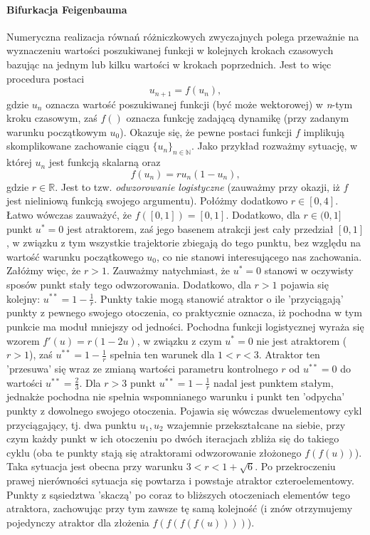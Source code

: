 \documentclass[12pt]{article}
\begin{document}
\paragraph{Bifurkacja Feigenbauma}
Numeryczna realizacja równań różniczkowych zwyczajnych polega przeważnie na wyznaczeniu wartości poszukiwanej funkcji w kolejnych krokach czasowych bazując na jednym lub kilku wartości w krokach poprzednich. Jest to więc procedura postaci
\begin{equation}
\label{discrete_dyn_eq}
u_{n+1} = f(u_{n}),
\end{equation}
gdzie $ u_{n} $ oznacza wartość poszukiwanej funkcji (być może wektorowej) w \textit{n}-tym kroku czasowym, zaś $ f() $ oznacza funkcję zadającą dynamikę (przy zadanym warunku początkowym $ u_{0} $). Okazuje się, że pewne postaci funkcji $ f $ implikują skomplikowane zachowanie ciągu $ \{u_{n}\}_{n\in \mathbb{N}} $. Jako przykład rozważmy sytuację, w której $ u_{n} $ jest funkcją skalarną oraz 
\begin{equation} 
f(u_{n}) = ru_{n}(1-u_{n}),
\end{equation}
gdzie $ r \in \mathbb{R} $. Jest to tzw. \textit{odwzorowanie logistyczne} (zauważmy przy okazji, iż $ f $ jest nieliniową funkcją swojego argumentu). Połóżmy dodatkowo $ r \in [0,4] $. Łatwo wówczas zauważyć, że $ f([0,1]) = [0,1] $. Dodatkowo, dla $ r\in (0,1] $ punkt $ u^{*} = 0 $ jest atraktorem, zaś jego basenem atrakcji jest cały przedział $ [0,1] $, w związku z tym wszystkie trajektorie zbiegają do tego punktu, bez względu na wartość warunku początkowego $ u_{0} $, co nie stanowi interesującego nas zachowania. Załóżmy więc, że $ r>1 $. Zauważmy natychmiast, że $ u^{*} = 0 $ stanowi w oczywisty sposów punkt stały tego odwzorowania. Dodatkowo, dla $ r>1 $ pojawia się kolejny: $ u^{**} = 1-\frac{1}{r} $. Punkty takie mogą stanowić atraktor o ile 'przyciągają' punkty z pewnego swojego otoczenia, co praktycznie oznacza, iż pochodna w tym punkcie ma moduł mniejszy od jedności. Pochodna funkcji logistycznej wyraża się wzorem $ f'(u) = r(1-2u) $, w związku z czym $ u^{*} = 0 $ nie jest atraktorem ($ r>1 $), zaś $ u^{**} = 1-\frac{1}{r} $ spełnia ten warunek dla $ 1<r<3 $. Atraktor ten 'przesuwa' się wraz ze zmianą wartości parametru kontrolnego $ r $ od $ u^{**} = 0 $ do wartości $ u^{**} = \frac{2}{3} $. \newline
Dla  $ r>3 $ punkt $ u^{**} = 1-\frac{1}{r} $ nadal jest punktem stałym, jednakże pochodna nie spełnia wspomnianego warunku i punkt ten 'odpycha' punkty z dowolnego swojego otoczenia. Pojawia się wówczas dwuelementowy cykl przyciągający, tj. dwa punktu $ u_{1}, u_{2} $ wzajemnie przekształcane na siebie, przy czym każdy punkt w ich otoczeniu po dwóch iteracjach zbliża się do takiego cyklu (oba te punkty stają się atraktorami odwzorowanie złożonego $ f(f(u)) $). Taka sytuacja jest obecna przy warunku $ 3<r<1+\sqrt{6} $. Po przekroczeniu prawej nierówności sytuacja się powtarza i powstaje atraktor czteroelementowy. Punkty z sąsiedztwa 'skaczą' po coraz to bliższych otoczeniach elementów tego atraktora, zachowując przy tym zawsze tę samą kolejność (i znów otrzymujemy pojedynczy atraktor dla złożenia $ f(f(f(f(u)))) $).\newline
\end{document}

